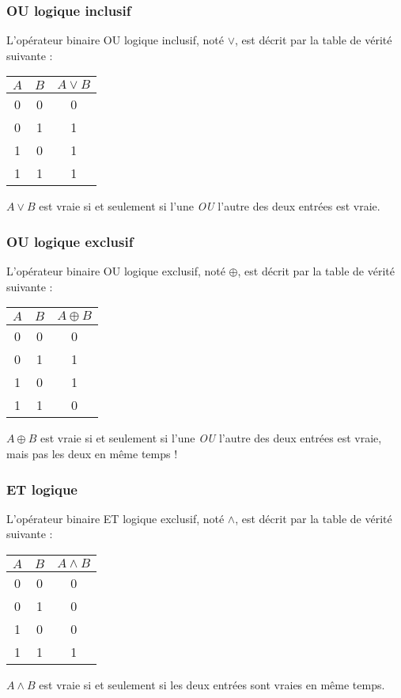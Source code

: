 \documentclass[../../main.tex]{subfiles}
\begin{document}
\subsubsection{OU logique inclusif}
L'opérateur binaire OU logique inclusif, noté $\vee$, est décrit par la table de vérité suivante :
\begin{center}
\begin{tabular}{c|c|c}
$A$ & $B$ & $A\vee{B}$ \\
\hline
0 & 0 & 0 \\
0 & 1 & 1 \\
1 & 0 & 1 \\
1 & 1 & 1 \\
\end{tabular}
\end{center}
$A\vee{B}$ est vraie si et seulement si l'une \textit{OU} l'autre des deux entrées est vraie.
\subsubsection{OU logique exclusif}
L'opérateur binaire OU logique exclusif, noté $\oplus$, est décrit par la table de vérité suivante :
\begin{center}
\begin{tabular}{c|c|c}
$A$ & $B$ & $A\oplus{B}$ \\
\hline
0 & 0 & 0 \\
0 & 1 & 1 \\
1 & 0 & 1 \\
1 & 1 & 0 \\
\end{tabular}
\end{center}
$A\oplus{B}$ est vraie si et seulement si l'une \textit{OU} l'autre des deux entrées est vraie, mais pas les deux en même temps !
\subsubsection{ET logique}
L'opérateur binaire ET logique exclusif, noté $\wedge$, est décrit par la table de vérité suivante :
\begin{center}
\begin{tabular}{c|c|c}
$A$ & $B$ & $A\wedge{B}$ \\
\hline
0 & 0 & 0 \\
0 & 1 & 0 \\
1 & 0 & 0 \\
1 & 1 & 1 \\
\end{tabular}
\end{center}
$A\wedge{B}$ est vraie si et seulement si les deux entrées sont vraies en même temps.
\end{document}
